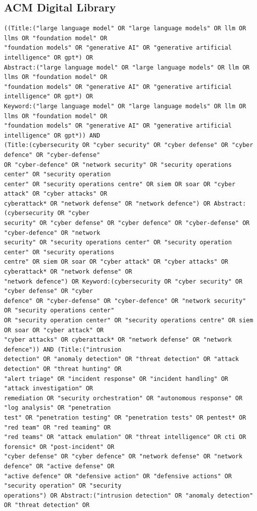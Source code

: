 \subsection*{ACM Digital Library}
\begin{lstlisting}
((Title:("large language model" OR "large language models" OR llm OR llms OR "foundation model" OR
"foundation models" OR "generative AI" OR "generative artificial intelligence" OR gpt*) OR
Abstract:("large language model" OR "large language models" OR llm OR llms OR "foundation model" OR
"foundation models" OR "generative AI" OR "generative artificial intelligence" OR gpt*) OR
Keyword:("large language model" OR "large language models" OR llm OR llms OR "foundation model" OR
"foundation models" OR "generative AI" OR "generative artificial intelligence" OR gpt*)) AND
(Title:(cybersecurity OR "cyber security" OR "cyber defense" OR "cyber defence" OR "cyber-defense"
OR "cyber-defence" OR "network security" OR "security operations center" OR "security operation
center" OR "security operations centre" OR siem OR soar OR "cyber attack" OR "cyber attacks" OR
cyberattack* OR "network defense" OR "network defence") OR Abstract:(cybersecurity OR "cyber
security" OR "cyber defense" OR "cyber defence" OR "cyber-defense" OR "cyber-defence" OR "network
security" OR "security operations center" OR "security operation center" OR "security operations
centre" OR siem OR soar OR "cyber attack" OR "cyber attacks" OR cyberattack* OR "network defense" OR
"network defence") OR Keyword:(cybersecurity OR "cyber security" OR "cyber defense" OR "cyber
defence" OR "cyber-defense" OR "cyber-defence" OR "network security" OR "security operations center"
OR "security operation center" OR "security operations centre" OR siem OR soar OR "cyber attack" OR
"cyber attacks" OR cyberattack* OR "network defense" OR "network defence")) AND (Title:("intrusion
detection" OR "anomaly detection" OR "threat detection" OR "attack detection" OR "threat hunting" OR
"alert triage" OR "incident response" OR "incident handling" OR "attack investigation" OR
remediation OR "security orchestration" OR "autonomous response" OR "log analysis" OR "penetration
test" OR "penetration testing" OR "penetration tests" OR pentest* OR "red team" OR "red teaming" OR
"red teams" OR "attack emulation" OR "threat intelligence" OR cti OR forensic* OR "post-incident" OR
"cyber defense" OR "cyber defence" OR "network defense" OR "network defence" OR "active defense" OR
"active defence" OR "defensive action" OR "defensive actions" OR "security operation" OR "security
operations") OR Abstract:("intrusion detection" OR "anomaly detection" OR "threat detection" OR

\end{lstlisting}
